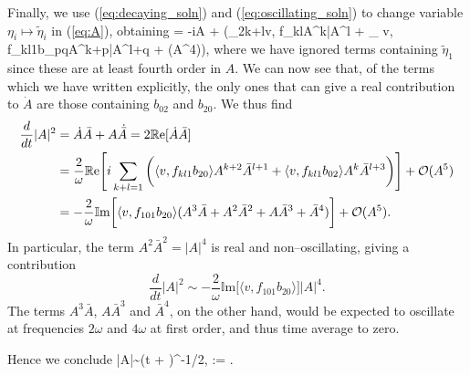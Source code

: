 Finally, we use (\ref{eq:decaying_soln}) and (\ref{eq:oscillating_soln}) to change variable $\eta_i\mapsto\tilde{\eta}_i$ in (\ref{eq:A}), obtaining
\be \label{eq:A2}
 = -i\omega A + \Bigg(\sum_{2\leq k+l}\langle v, f_{kl}\rangle A^k\bar{A}^l + \sum_{} \langle v, f_{kl1}b_{pq}\rangle A^{k+p}\bar{A}^{l+q} + \cO(A^4)\Bigg),
\ee
where we have ignored terms containing $\tilde{\eta}_1$ since these are at least fourth order in $A$. We can now see that, of the terms which we have written explicitly, the only ones that can give a real contribution to $\dot{A}$ are those containing $b_{02}$ and $b_{20}$. We thus find
\begin{align*}
\frac{d}{dt}|A|^2 &= \dot{A}\bar{A} + A\dot{\bar{A}} = 2\mathbb{R}\mathrm{e}[\dot{A}\bar{A}] \\
&= \frac{2}{\omega} \mathbb{R}\mathrm{e}\Bigg[i\sum_{k+l=1}\bigg( \langle v, f_{kl1}b_{20}\rangle A^{k+2}\bar{A}^{l+1} + \langle v, f_{kl1}b_{02}\rangle A^{k}\bar{A}^{l+3} \bigg) \Bigg] + \mathcal{O}(A^5) \\
&= -\frac{2}{\omega} \mathbb{I}\mathrm{m}\bigg[\langle v, f_{101}b_{20}\rangle(A^3\bar{A} + A^2\bar{A}^2 + A\bar{A}^3 + \bar{A}^4) \bigg] + \mathcal{O}(A^5).
\end{align*}
In particular, the term $A^2\bar{A}^2=|A|^4$ is real and non--oscillating, giving a contribution
\[
\frac{d}{dt}|A|^2 \sim -\frac{2}{\omega} \mathbb{I}\mathrm{m}\big[\langle v, f_{101}b_{20}\rangle\big]|A|^4.
\]
The terms $A^3\bar{A}$, $A\bar{A}^3$ and $\bar{A}^4$, on the other hand, would be expected to oscillate at frequencies $2\omega$ and $4\omega$ at first order, and thus time average to zero.

Hence we conclude
\be \label{eq:decay_behaviou}
|A|\sim \bigg(\Gamma t + \bigg)^{-1/2}, \qquad \Gamma:= .
\ee

